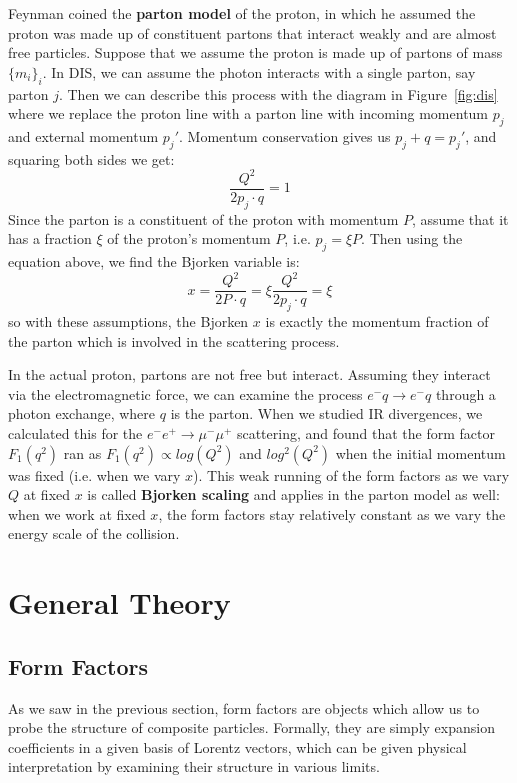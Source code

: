 \documentclass[11pt, oneside]{article}   	%
\theoremstyle{definition}
\begin{document}
Feynman coined the \textbf{parton model} of the proton, in which he assumed the proton was made up of constituent 
partons that interact weakly and are almost free particles. Suppose that we assume the proton is made up of partons of mass 
$\{m_i\}_{i}$. In DIS, we can assume the photon interacts with a single parton, say parton $j$. Then we can describe this process 
with the diagram in Figure~\ref{fig:dis} where we replace the proton line with a parton line with incoming momentum $p_j$ and external 
momentum $p_j'$. Momentum conservation gives us $p_j + q = p_j'$, and squaring both sides we get:
\begin{equation}
	\frac{Q^2}{2p_j\cdot q} = 1
\end{equation}
Since the parton is a constituent of the proton with momentum $P$, assume that it has a fraction $\xi$ of the proton's 
momentum $P$, i.e. $p_j = \xi P$. Then using the equation above, we find the Bjorken variable is:
\begin{equation}
	x = \frac{Q^2}{2P\cdot q} = \xi \frac{Q^2}{2p_j\cdot q} = \xi
\end{equation}
so with these assumptions, the Bjorken $x$ is exactly the momentum fraction of the parton which is involved in the scattering 
process. 

In the actual proton, partons are not free but interact. Assuming they interact via the electromagnetic force, we can 
examine the process $e^-q\rightarrow e^-q$ through a photon exchange, where $q$ is the parton. When we studied IR divergences, 
we calculated this for the $e^-e^+\rightarrow\mu^-\mu^+$ scattering, and found that the form factor $F_1(q^2)$ ran as $F_1(q^2)\propto 
log(Q^2)$ and $log^2(Q^2)$ when the initial momentum was fixed (i.e. when we vary $x$). This weak running of the form factors 
as we vary $Q$ at fixed $x$ is called \textbf{Bjorken scaling} and applies in the parton model as well: when we work at fixed $x$, 
the form factors stay relatively constant as we vary the energy scale of the collision. 

\newpage
\section{General Theory}

\subsection{Form Factors}

As we saw in the previous section, form factors are objects which allow us to probe the structure of composite particles. Formally, 
they are simply expansion coefficients in a given basis of Lorentz vectors, which can be given physical interpretation by 
examining their structure in various limits. 
\end{document}
